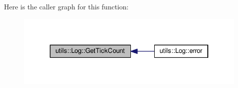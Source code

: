 Here is the caller graph for this function\+:
\nopagebreak
\begin{figure}[H]
\begin{center}
\leavevmode
\includegraphics[width=322pt]{classutils_1_1Log_ae8791e18abf55ade26b8bcbae0921eaf_icgraph}
\end{center}
\end{figure}



